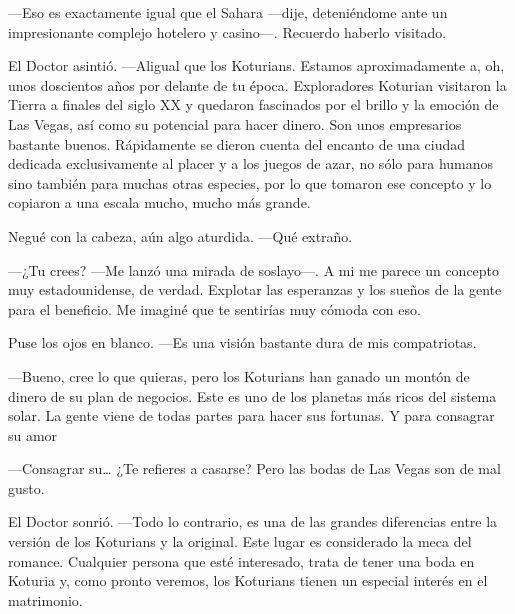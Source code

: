 ---Eso es exactamente igual que el Sahara ---dije, deteniéndome ante un
impresionante complejo hotelero y casino---. Recuerdo haberlo visitado.

El Doctor asintió. ---Aligual que los Koturians. Estamos aproximadamente
a, oh, unos doscientos años por delante de tu época. Exploradores
Koturian visitaron la Tierra a finales del siglo XX y quedaron
fascinados por el brillo y la emoción de Las Vegas, así como su
potencial para hacer dinero. Son unos empresarios bastante buenos.
Rápidamente se dieron cuenta del encanto de una ciudad dedicada
exclusivamente al placer y a los juegos de azar, no sólo para humanos
sino también para muchas otras especies, por lo que tomaron ese concepto
y lo copiaron a una escala mucho, mucho más grande.

Negué con la cabeza, aún algo aturdida. ---Qué extraño.

---¿Tu crees? ---Me lanzó una mirada de soslayo---. A mi me parece un
concepto muy estadounidense, de verdad. Explotar las esperanzas y los
sueños de la gente para el beneficio. Me imaginé que te sentirías muy
cómoda con eso.

Puse los ojos en blanco. ---Es una visión bastante dura de mis
compatriotas.

---Bueno, cree lo que quieras, pero los Koturians han ganado un montón
de dinero de su plan de negocios. Este es uno de los planetas más ricos
del sistema solar. La gente viene de todas partes para hacer sus
fortunas. Y para consagrar su amor

---Consagrar su\ldots{} ¿Te refieres a casarse? Pero las bodas de Las
Vegas son de mal gusto.

El Doctor sonrió. ---Todo lo contrario, es una de las grandes
diferencias entre la versión de los Koturians y la original. Este lugar
es considerado la meca del romance. Cualquier persona que esté
interesado, trata de tener una boda en Koturia y, como pronto veremos,
los Koturians tienen un especial interés en el matrimonio.